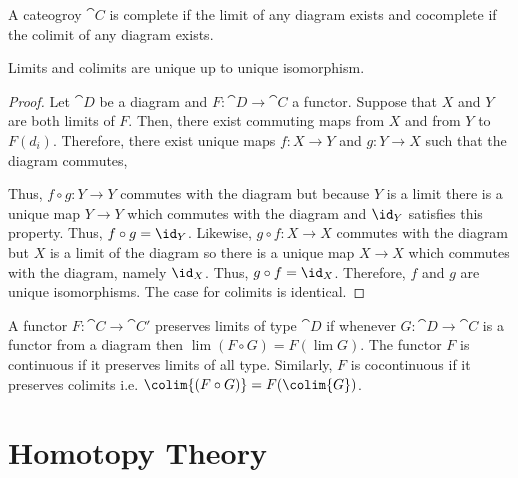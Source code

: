 \documentclass[12pt]{extarticle}
\begin{document}
\begin{definition}
A cateogroy $\cat{C}$ is complete if the limit of any diagram exists and cocomplete if the colimit of any diagram exists. 
\end{definition}

\begin{theorem}
Limits and colimits are unique up to unique isomorphism.
\end{theorem}

\begin{proof}
Let $\cat{D}$ be a diagram and $F : \cat{D} \to \cat{C}$ a functor. Suppose that $X$ and $Y$ are both limits of $F$. Then, there exist commuting maps from $X$ and from $Y$ to $F(d_i)$. Therefore, there exist unique maps $f : X \to Y$ and $g : Y \to X$ such that the diagram commutes, 
\begin{center}
\end{center}
Thus, $f \circ g : Y \to Y$ commutes with the diagram but because $Y$ is a limit there is a unique map $Y \to Y$ which commutes with the diagram and $\id_Y$ satisfies this property. Thus, $f \circ g = \id_Y$. Likewise, $g \circ f : X \to X$ commutes with the diagram but $X$ is a limit of the diagram so there is a unique map $X \to X$ which commutes with the diagram, namely $\id_X$. Thus, $g \circ f = \id_X$. Therefore, $f$ and $g$ are unique isomorphisms. The case for colimits is identical. 
\end{proof}

\begin{definition}
A functor $F : \cat{C} \to \cat{C}'$ preserves limits of type $\cat{D}$ if whenever $G : \cat{D} \to \cat{C}$ is a functor from a diagram then $\lim{(F \circ G)} = F(\lim{G})$. The functor $F$ is continuous if it preserves limits of all type. Similarly, $F$ is cocontinuous if it preserves colimits i.e. $\colim{(F \circ G)} = F(\colim{G})$. 
\end{definition}

\section{Homotopy Theory}
\end{document}
